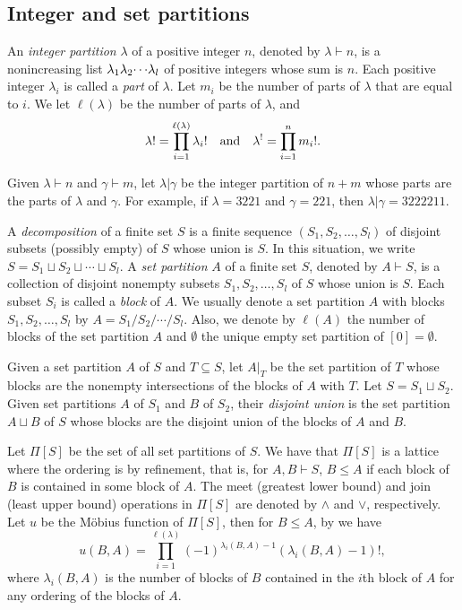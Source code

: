 \documentclass[12pt]{amsart}  %
\theoremstyle{definition}
\theoremstyle{remark}
\numberwithin{equation}{section}
\newcommand{\mymu}{{u}}
\newcommand\svw[1]{{\color{black}{#1}}}
\begin{document}
 
 

\subsection{Integer and set partitions}
An \emph{integer partition} $\lambda$ of a positive integer $n$, denoted by $\lambda\vdash n$, is a nonincreasing list $\lambda_1\lambda_2\svw{\cdots} \lambda_l$ of positive integers whose sum is $n$. Each positive integer $\lambda_i$ is called a \emph{part} of $\lambda$. Let $m_i$ be the number of parts of $\lambda$ that are equal to $i$. 
 We let $\ell(\lambda)$ be the number of parts of $\lambda$, and $$ \lambda!=\prod_{i=1}^{\ell(\lambda)}\svw{\lambda_i !}\quad \text{and}\quad  \lambda^!=\prod_{i=1}^{n}m_i!.$$
 
 Given $\lambda\vdash n$ and $\gamma\vdash m$, let $\lambda|\gamma$ be the integer partition of $n+m$ whose parts are the parts of $\lambda$ and $\gamma$. For example, if $\lambda=3221$ and $\gamma=221$, then $\lambda|\gamma=3222211$.
 
 A \emph{decomposition} of a finite set $S$ is a finite sequence $(S_1,S_2, \dots, S_l)$ of disjoint subsets (possibly empty)
of $S$ whose union is $S$. In this situation, we write
$S=S_1\sqcup S_2 \sqcup \cdots \sqcup S_l$. 
  A \emph{set partition} $A$ of a finite set $S$, denoted by $A\vdash S$, is a collection of disjoint nonempty subsets $S_1,S_2, \dots, S_l$ of $S$ whose union is $S$. Each subset $S_i$ is called a \emph{block} of $A$.   We usually denote a set partition $A$ with blocks $S_1, S_2, \dots, S_l$ by $A=S_1/S_2/\cdots/S_l$.  Also, we denote by $\ell(A)$ the number of blocks of the set partition $A$ and \svw{by} $\emptyset$ the unique empty set partition of $[0]=\emptyset$. 
  
  Given a set partition $A$ of $S$ and $T\subseteq S$, let $A|_T$ be the set partition of $T$ whose blocks are the nonempty intersections of the blocks of $A$ with $T$. Let $S=S_1\sqcup  S_2$. Given set partitions $A$ of $S_1$ and $B$ of $S_2$, their \emph{disjoint union} is the set partition $A\sqcup B$ of $S$ whose blocks are the disjoint union of the blocks of $A$ and $B$. 
  
  
Let $\Pi[S]$ be the set of all set partitions of $S$. We have that $\Pi[S]$ is a lattice where the ordering is by refinement, that is, for $A, B \vdash   S$, \svw{we write} $B\leq A$ if each block of $B$ is contained in some block of $A$. The meet (greatest lower bound) and join (least upper bound) operations in $\Pi[S]$ are denoted by $\wedge$
and $\vee$, respectively.
Let $\mymu$ be the M\"obius function of $\Pi[S]$, then for $B\leq A$,  by \cite[Section 3]{RS} we have 
\begin{equation}\label{eq:Mobius}
\mymu(B,A)= \prod_{i=1}^{\ell(\lambda)} (-1)^{\lambda_i(B,A)-1}(\lambda_i(B,A)-1)!,
\end{equation} 
 where $\lambda_i(B,A)$ is the number of blocks of $B$ contained in the $i$th block of $A$ for any ordering of the blocks of $A$. 
  
\end{document}
